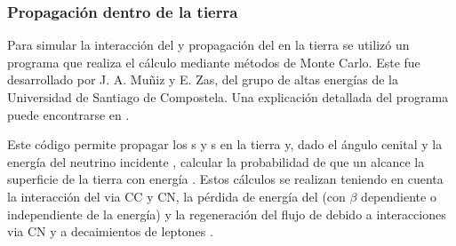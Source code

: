 		\subsubsection{\label{sbsbsc:sim_prop_tierra}Propagaci\'on dentro de la tierra}
	
		Para simular la interacción del \nutau{} y propagaci\'on del \tauon{} en la tierra se utiliz\'o un programa que realiza el c\'alculo mediante m\'etodos de Monte Carlo. Este fue desarrollado por J. A. Mu\~niz y E. Zas, del grupo de altas energ\'ias de la Universidad de Santiago de Compostela.
		Una explicaci\'on detallada del programa puede encontrarse en \cite{gap_tau_tierra}.
		
		Este c\'odigo permite propagar los \nutau{}s y \tauon{}s en la tierra y, dado el \'angulo cenital \tita{} y la energ\'ia del neutrino incidente \enu{}, calcular la probabilidad de que un \tauon{} alcance la superficie de la tierra con energ\'ia \etau{}.
		Estos c\'alculos se realizan teniendo en cuenta la interacci\'on del \nutau{} via CC y CN, la p\'erdida de energ\'ia del \tauon{} (con $\beta$
		dependiente o independiente de la energ\'ia) y la regeneraci\'on del flujo de \nutau{} debido a interacciones via CN y a decaimientos de leptones \tauon{}.
		
